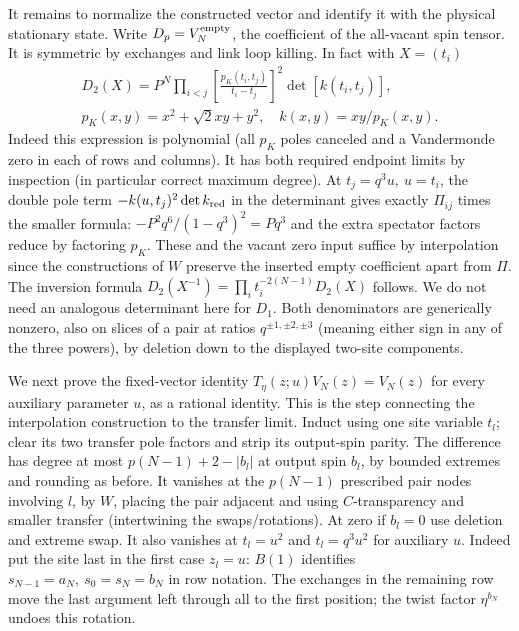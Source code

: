 It remains to normalize the constructed vector and identify it with the
physical stationary state. Write \(D_p=V_N^{\rm empty}\), the coefficient
of the all-vacant spin tensor. It is symmetric by exchanges and link loop killing. In fact with \(X=(t_i)\)
\[\begin{gathered}
 D_2(X)=P^N\!\prod_{i<j}\left[\frac{p_K(t_i,t_j)}{t_i-t_j}\right]^2 \det[k(t_i,t_j)],\\
 p_K(x,y)=x^2+\sqrt2xy+y^2,\quad k(x,y)=xy/p_K(x,y).
\end{gathered}\]
Indeed this expression is polynomial (all \(p_K\) poles canceled and a Vandermonde zero in each of rows and columns). It has both required endpoint limits by inspection (in particular correct maximum degree). At \(t_j=q^3u,\ u=t_i\), the double pole term \(-k(u,t_j)^2\det k_{\rm red}\) in the determinant gives exactly \(\Pi_{ij}\) times the smaller formula: \(-P^2 q^6/(1-q^3)^2=P q^3\) and the extra spectator factors reduce by factoring \(p_K\). These and the vacant zero input suffice by interpolation since the constructions of \(W\) preserve the inserted empty coefficient apart from \(\Pi\). The inversion formula \(D_2(X^{-1})=\prod_i t_i^{-2(N-1)} D_2(X)\) follows. We do not need an analogous determinant here for \(D_1\). Both denominators are generically nonzero, also on slices of a pair at ratios \(q^{\pm1,\pm2,\pm3}\) (meaning either sign in any of the three powers), by deletion down to the displayed two-site components.

We next prove the fixed-vector identity
$T_\eta(z;u)V_N(z)=V_N(z)$ for every auxiliary parameter $u$, as a rational
identity. This is the step connecting the interpolation construction to
the transfer limit. Induct using one site variable \(t_l\); clear its two transfer pole factors and strip its output-spin parity. The difference has degree at most \(p(N-1)+2-|b_l|\) at output spin \(b_l\), by bounded extremes and rounding as before. It vanishes at the \(p(N-1)\) prescribed pair nodes involving \(l\), by \(W\), placing the pair adjacent and using \(C\)-transparency and smaller transfer (intertwining the swaps/rotations). At zero if \(b_l=0\) use deletion and extreme swap. It also vanishes at \(t_l=u^2\) and \(t_l=q^3u^2\) for auxiliary \(u\). Indeed put the site last in the first case \(z_l=u\): \(B(1)\) identifies \(s_{N-1}=a_N,\ s_0=s_N=b_N\) in row notation. The exchanges in the remaining row move the last argument left through all to the first position; the twist factor \(\eta^{b_N}\) undoes this rotation.

